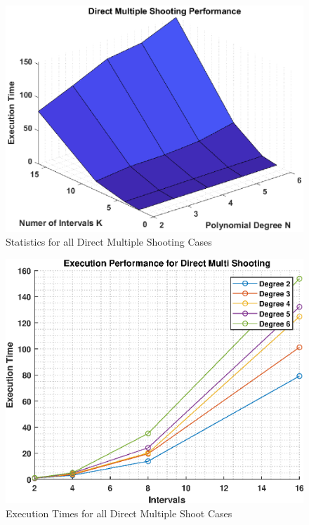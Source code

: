 \documentclass[]{article}
\begin{document}
\begin{figure}
	\centering
	\includegraphics[scale=0.75]{directMultiShootPerform.eps}
	\caption{Statistics for all Direct Multiple Shooting Cases}
	\label{fig:Direct_Multiple_Shooting_Performance}
\end{figure}
\begin{figure}
	\centering
	\includegraphics[scale=0.75]{directMultiShootExec.eps}
	\caption{Execution Times for all Direct Multiple Shoot Cases}
	\label{fig:directMultiShootExec}
\end{figure}
\FloatBarrier
\end{document}
